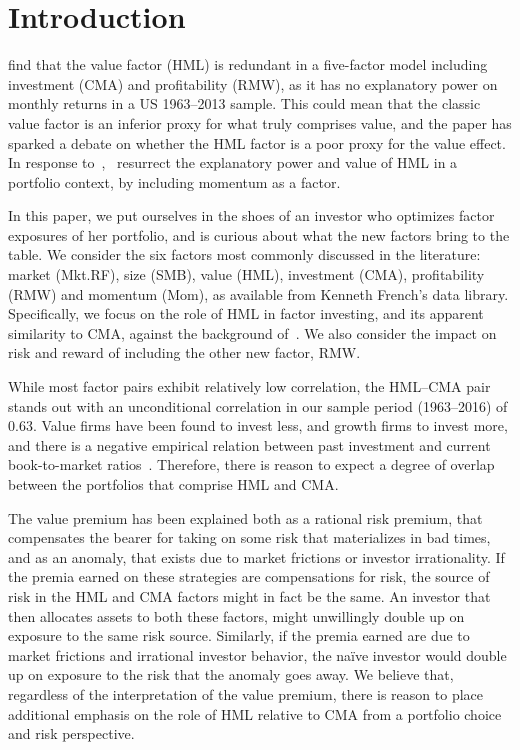 \section{Introduction}
\textcite{FF2015} find that the value factor (HML) is redundant in a five-factor model including investment (CMA) and profitability (RMW), as it has no explanatory power on monthly returns in a US 1963–2013 sample. This could mean that the classic value factor is an inferior proxy for what truly comprises value, and the paper has sparked a debate on whether the HML factor is a poor proxy for the value effect. In response to~\textcite{FF2015},~\textcite{Asness2015} resurrect the explanatory power and value of HML in a portfolio context, by including momentum as a factor.

In this paper, we put ourselves in the shoes of an investor who optimizes factor exposures of her portfolio, and is curious about what the new factors bring to the table. We consider the six factors most commonly discussed in the literature: market (Mkt.RF), size (SMB), value (HML), investment (CMA), profitability (RMW) and momentum (Mom), as available from Kenneth French's data library. Specifically, we focus on the role of HML in factor investing, and its apparent similarity to CMA, against the background of~\textcite{FF2015,Asness2015}. We also consider the impact on risk and reward of including the other new factor, RMW.

While most factor pairs exhibit relatively low correlation, the HML--CMA pair stands out with an unconditional correlation in our sample period (1963--2016) of 0.63. Value firms have been found to invest less, and growth firms to invest more, and there is a negative empirical relation between past investment and current book-to-market ratios~\autocite{Zhang2005,AndersonGarciaFeijoo2006}. Therefore, there is reason to expect a degree of overlap between the portfolios that comprise HML and CMA.

The value premium has been explained both as a rational risk premium, that compensates the bearer for taking on some risk that materializes in bad times, and as an anomaly, that exists due to market frictions or investor irrationality. If the premia earned on these strategies are compensations for risk, the source of risk in the HML and CMA factors might in fact be the same. An investor that then allocates assets to both these factors, might unwillingly double up on exposure to the same risk source. Similarly, if the premia earned are due to market frictions and irrational investor behavior, the naïve investor would double up on exposure to the risk that the anomaly goes away. We believe that, regardless of the interpretation of the value premium, there is reason to place additional emphasis on the role of HML relative to CMA from a portfolio choice and risk perspective.

